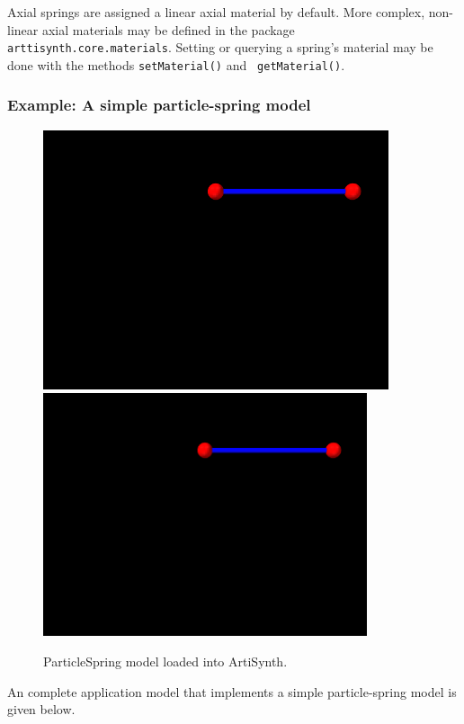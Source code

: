 Axial springs are assigned a linear axial material by default.  More
complex, non-linear axial materials may be defined in the package {\tt
arttisynth.core.materials}. Setting or querying a spring's material
may be done with the methods {\tt setMaterial()} and {\tt
getMaterial()}.

\subsubsection{Example: A simple particle-spring model}
\label{ParticleSpringExample:sec}

\begin{figure}[t]
\begin{center}
\iflatexml
 \includegraphics[]{images/ParticleSpring}
\else
 \includegraphics[width=3.75in]{images/ParticleSpring}
\fi
\end{center}
\caption{ParticleSpring model loaded into ArtiSynth.}
\label{ParticleSpring:fig}
\end{figure}

An complete application model that implements a simple particle-spring
model is given below. 
\lstset{numbers=left}

\lstset{numbers=none}

